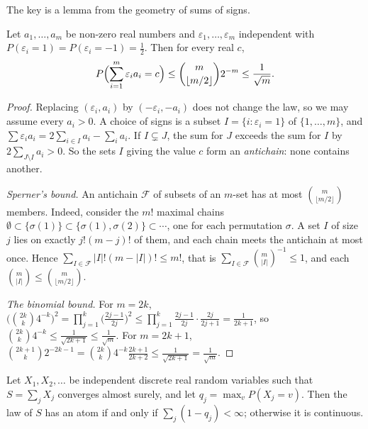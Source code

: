 The key is a lemma from the geometry of sums of signs.

\begin{lemma}\label{lem:lo}
Let $a_1,\dots,a_m$ be non-zero real numbers and $\varepsilon_1,\dots,\varepsilon_m$ independent with $P(\varepsilon_i=1)=P(\varepsilon_i=-1)=\frac12$. Then for every real $c$,
\[
P\Bigl(\sum_{i=1}^m\varepsilon_ia_i=c\Bigr)\le\binom m{\lfloor m/2\rfloor}2^{-m}\le\frac1{\sqrt m}.
\]
\end{lemma}
\begin{proof}
Replacing $(\varepsilon_i,a_i)$ by $(-\varepsilon_i,-a_i)$ does not change the law, so we may assume every $a_i>0$. A choice of signs is a subset $I=\{i:\varepsilon_i=1\}$ of $\{1,\dots,m\}$, and $\sum\varepsilon_ia_i=2\sum_{i\in I}a_i-\sum_ia_i$. If $I\subsetneq J$, the sum for $J$ exceeds the sum for $I$ by $2\sum_{J\setminus I}a_i>0$. So the sets $I$ giving the value $c$ form an \emph{antichain}: none contains another.

\emph{Sperner's bound.} An antichain $\mathcal F$ of subsets of an $m$-set has at most $\binom m{\lfloor m/2\rfloor}$ members. Indeed, consider the $m!$ maximal chains $\emptyset\subset\{\sigma(1)\}\subset\{\sigma(1),\sigma(2)\}\subset\cdots$, one for each permutation $\sigma$. A set $I$ of size $j$ lies on exactly $j!(m-j)!$ of them, and each chain meets the antichain at most once. Hence $\sum_{I\in\mathcal F}|I|!(m-|I|)!\le m!$, that is $\sum_{I\in\mathcal F}\binom m{|I|}^{-1}\le1$, and each $\binom m{|I|}\le\binom m{\lfloor m/2\rfloor}$.

\emph{The binomial bound.} For $m=2k$, $\bigl(\binom{2k}k4^{-k}\bigr)^2=\prod_{j=1}^k\bigl(\frac{2j-1}{2j}\bigr)^2\le\prod_{j=1}^k\frac{2j-1}{2j}\cdot\frac{2j}{2j+1}=\frac1{2k+1}$, so $\binom{2k}k4^{-k}\le\frac1{\sqrt{2k+1}}\le\frac1{\sqrt m}$. For $m=2k+1$, $\binom{2k+1}k2^{-2k-1}=\binom{2k}k4^{-k}\frac{2k+1}{2k+2}\le\frac1{\sqrt{2k+1}}=\frac1{\sqrt m}$.
\end{proof}

\begin{theorem}[L\'evy, 1931]\label{thm:levyatoms}
Let $X_1,X_2,\dots$ be independent discrete real random variables such that $S=\sum_jX_j$ converges almost surely, and let $q_j=\max_vP(X_j=v)$. Then the law of $S$ has an atom if and only if $\sum_j(1-q_j)<\infty$; otherwise it is continuous.
\end{theorem}

